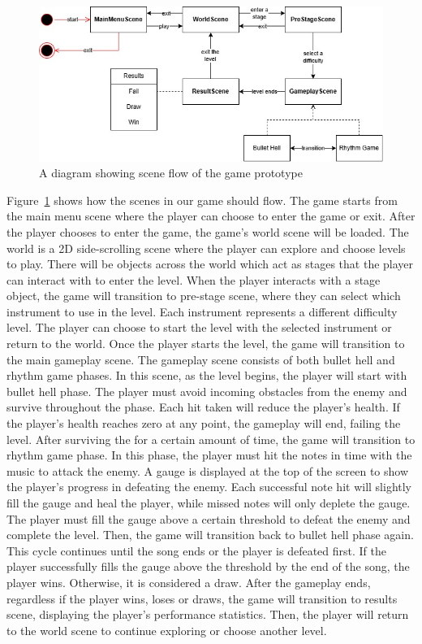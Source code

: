 \begin{figure}[h]
    \centering
    \includegraphics[width=\columnwidth, keepaspectratio]{images/gameflow}
    \caption{A diagram showing scene flow of the game prototype}
    \label{fig:gameflow}
\end{figure}

\vspace{0.5cm}

\noindent Figure~\ref{fig:gameflow} shows how the scenes in our game should flow.
The game starts from the main menu scene where the player can choose to enter the game or exit.
After the player chooses to enter the game, the game's world scene will be loaded.
The world is a 2D side-scrolling scene where the player can explore and choose levels to play.
There will be objects across the world which act as stages that the player can interact with to 
enter the level.
When the player interacts with a stage object, the game will transition to pre-stage scene, where 
they can select which instrument to use in the level.
Each instrument represents a different difficulty level.
The player can choose to start the level with the selected instrument or return to the world.
Once the player starts the level, the game will transition to the main gameplay scene.
The gameplay scene consists of both bullet hell and rhythm game phases.
In this scene, as the level begins, the player will start with bullet hell phase.
The player must avoid incoming obstacles from the enemy and survive throughout the phase.
Each hit taken will reduce the player's health.
If the player's health reaches zero at any point, the gameplay will end, failing the level.
After surviving the for a certain amount of time, the game will transition to rhythm game phase.
In this phase, the player must hit the notes in time with the music to attack the enemy.
A gauge is displayed at the top of the screen to show the player's progress in defeating the enemy.
Each successful note hit will slightly fill the gauge and heal the player, while missed notes will 
only deplete the gauge.
The player must fill the gauge above a certain threshold to defeat the enemy and complete the level.
Then, the game will transition back to bullet hell phase again.
This cycle continues until the song ends or the player is defeated first.
If the player successfully fills the gauge above the threshold by the end of the song, the player wins.
Otherwise, it is considered a draw.
After the gameplay ends, regardless if the player wins, loses or draws, the game will transition to results 
scene, displaying the player's performance statistics.
Then, the player will return to the world scene to continue exploring or choose another level.